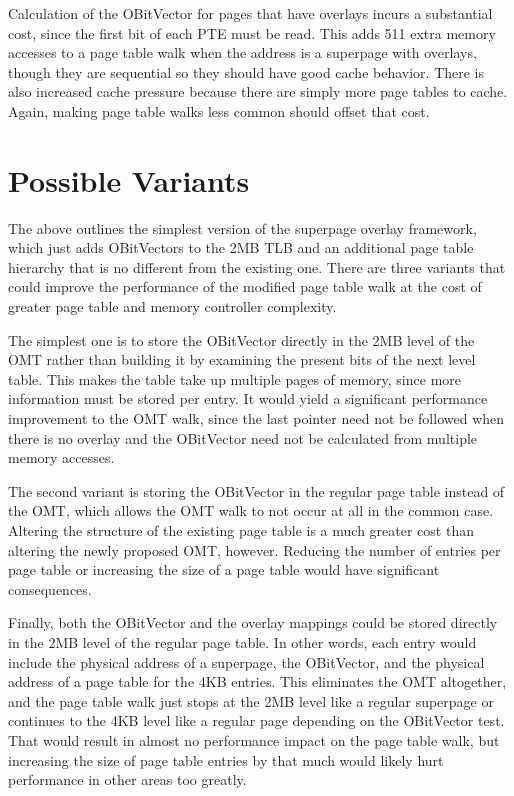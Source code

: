 Calculation of the OBitVector for pages that have overlays incurs a substantial cost, since the first bit of each PTE must be read. This adds 511 extra memory accesses to a page table walk when the address is a superpage with overlays, though they are sequential so they should have good cache behavior. There is also increased cache pressure because there are simply more page tables to cache. Again, making page table walks less common should offset that cost.

\section{Possible Variants}
The above outlines the simplest version of the superpage overlay framework, which just adds OBitVectors to the 2MB TLB and an additional page table hierarchy that is no different from the existing one. There are three variants that could improve the performance of the modified page table walk at the cost of greater page table and memory controller complexity.

The simplest one is to store the OBitVector directly in the 2MB level of the OMT rather than building it by examining the present bits of the next level table. This makes the table take up multiple pages of memory, since more information must be stored per entry. It would yield a significant performance improvement to the OMT walk, since the last pointer need not be followed when there is no overlay and the OBitVector need not be calculated from multiple memory accesses.

The second variant is storing the OBitVector in the regular page table instead of the OMT, which allows the OMT walk to not occur at all in the common case. Altering the structure of the existing page table is a much greater cost than altering the newly proposed OMT, however. Reducing the number of entries per page table or increasing the size of a page table would have significant consequences.

Finally, both the OBitVector and the overlay mappings could be stored directly in the 2MB level of the regular page table. In other words, each entry would include the physical address of a superpage, the OBitVector, and the physical address of a page table for the 4KB entries. This eliminates the OMT altogether, and the page table walk just stops at the 2MB level like a regular superpage or continues to the 4KB level like a regular page depending on the OBitVector test. That would result in almost no performance impact on the page table walk, but increasing the size of page table entries by that much would likely hurt performance in other areas too greatly.

